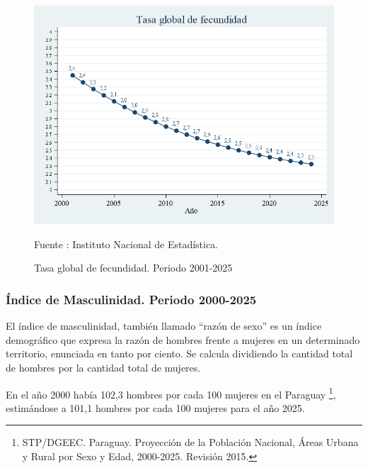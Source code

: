 \begin{figure}[H]
\begin{center}
                    \caption{Tasa global de fecundidad. Periodo 2001-2025}
                    \includegraphics[scale=0.45]{INEtasaglobalfecun.png}
                                    \item \footnotesize Fuente : Instituto Nacional de Estadística.
\end{center}
\end{figure}

\subsubsection{Índice de Masculinidad. Periodo 2000-2025}

El índice de masculinidad, también llamado ``razón de sexo'' es un
índice demográfico que expresa la razón de hombres frente a mujeres en
un determinado territorio, enunciada en tanto por ciento. Se calcula
dividiendo la cantidad total de hombres por la cantidad total de
mujeres.

En el año 2000 había 102,3 hombres por cada 100 mujeres en el Paraguay
\footnote{STP/DGEEC. Paraguay. Proyección de la Población Nacional, Áreas Urbana y Rural por Sexo y Edad, 2000-2025. Revisión 2015.},
estimándose a 101,1 hombres por cada 100 mujeres para el año 2025.

